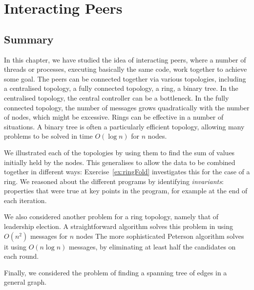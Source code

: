 \chapter{Interacting Peers}
\label{chap:interacting-peers}



\section{Summary}

In this chapter, we have studied the idea of interacting peers, where a number
of threads or processes, executing basically the same code, work together to
achieve some goal.  The peers can be connected together via various
topologies, including a centralised topology, a fully connected topology, a
ring, a binary tree.  In the centralised topology,
the central controller can be a bottleneck.  In the fully connected topology,
the number of messages grows quadratically with the number of nodes, which
might be excessive.  Rings can be effective in a number of situations.  A
binary tree is often a particularly efficient topology, allowing many problems
to be solved in time $O(\log n)$ for $n$ nodes.

We illustrated each of the topologies by using them to find the sum of
values initially held by the nodes.  This generalises to allow the data to be
combined together in different ways: Exercise~\ref{ex:ringFold} investigates
this for the case of a ring.
We reasoned about the different programs by identifying \emph{invariants}:
properties that were true at key points in the program, for example at the end
of each iteration. 

We also considered another problem for a ring topology, namely that of
leadership election.  A straightforward algorithm solves this problem in using
$O(n^2)$ messages for $n$ nodes  The more sophisticated Peterson algorithm
solves it using $O(n \log n)$ messages, by eliminating at least half the
candidates on each round.

Finally, we considered the problem of finding a spanning tree of edges in a
general graph. 



\exercises














